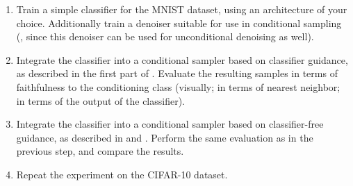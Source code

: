 \documentclass[../../book-main_zh.tex]{subfiles}
\begin{document}
\begin{exercise}
    \begin{enumerate}
        \item Train a simple classifier for the MNIST dataset, using
            an architecture
            of your choice. Additionally train a denoiser suitable for use in
            conditional sampling
            (,
                since this denoiser can be used for unconditional
            denoising as well).
        \item Integrate the classifier into a conditional sampler based on
            classifier guidance, as described in the first part of
            .
            Evaluate the resulting samples in terms of faithfulness to the
            conditioning class (visually; in terms of nearest
                neighbor; in terms of
            the output of the classifier).
        \item Integrate the classifier into a conditional sampler based on
            classifier-free guidance, as described in  and
            . Perform the same
            evaluation as in the previous step, and compare the results.
        \item Repeat the experiment on the CIFAR-10 dataset.
    \end{enumerate}

\end{exercise}
\end{document}
